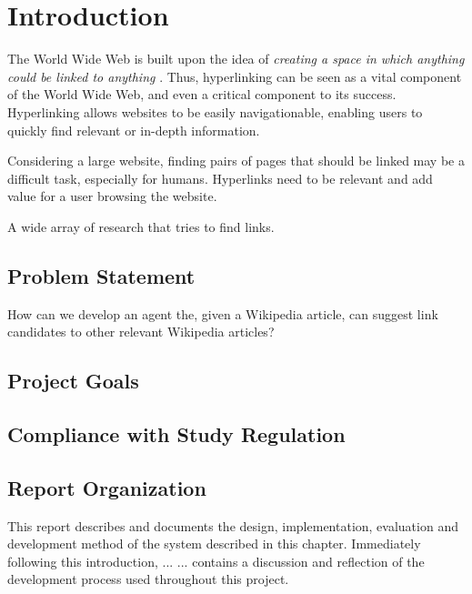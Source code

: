 \chapter{Introduction}
The World Wide Web is built upon the idea of \emph{creating a space in which anything could be linked to anything} . Thus, hyperlinking can be seen as a vital component of the World Wide Web, and even a critical component to its success. Hyperlinking allows websites to be easily navigationable, enabling users to quickly find relevant or in-depth information.

Considering a large website, finding pairs of pages that should be linked may be a difficult task, especially for humans. Hyperlinks need to be relevant and add value for a user browsing the website.

A wide array of research that tries to find links.


\section{Problem Statement}
How can we develop an agent the, given a Wikipedia article, can suggest link candidates to other relevant Wikipedia articles?

\section{Project Goals}

\section{Compliance with Study Regulation}

\section{Report Organization}
This report describes and documents the design, implementation, evaluation and development method of the system described in this chapter. Immediately following this introduction,  ... \dummy ...  contains a discussion and reflection of the development process used throughout this project.
